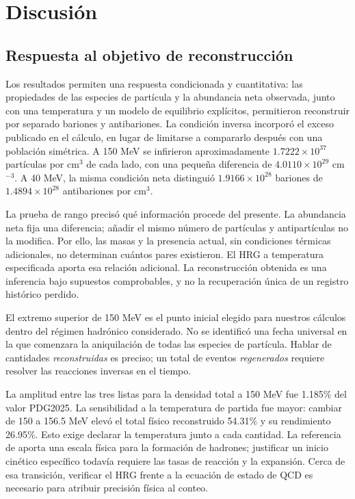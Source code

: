 \section{Discusión}
\subsection{Respuesta al objetivo de reconstrucción}
Los resultados permiten una respuesta condicionada y cuantitativa: las propiedades de las especies de partícula y la abundancia neta observada, junto con una temperatura y un modelo de equilibrio explícitos, permitieron reconstruir por separado bariones y antibariones. La condición inversa incorporó el exceso publicado en el cálculo, en lugar de limitarse a compararlo después con una población simétrica. A 150 MeV se infirieron aproximadamente $1.7222\times10^{37}$ partículas por cm$^3$ de cada lado, con una pequeña diferencia de $4.0110\times10^{29}$ cm$^{-3}$. A 40 MeV, la misma condición neta distinguió $1.9166\times10^{28}$ bariones de $1.4894\times10^{28}$ antibariones por cm$^3$.

La prueba de rango precisó qué información procede del presente. La abundancia neta fija una diferencia; añadir el mismo número de partículas y antipartículas no la modifica. Por ello, las masas y la presencia actual, sin condiciones térmicas adicionales, no determinan cuántos pares existieron. El HRG a temperatura especificada aporta esa relación adicional. La reconstrucción obtenida es una inferencia bajo supuestos comprobables, y no la recuperación única de un registro histórico perdido.

El extremo superior de 150 MeV es el punto inicial elegido para nuestros cálculos dentro del régimen hadrónico considerado. No se identificó una fecha universal en la que comenzara la aniquilación de todas las especies de partícula. Hablar de cantidades \emph{reconstruidas} es preciso; un total de eventos \emph{regenerados} requiere resolver las reacciones inversas en el tiempo.

La amplitud entre las tres listas para la densidad total a 150 MeV fue 1.185\% del valor PDG2025. La sensibilidad a la temperatura de partida fue mayor: cambiar de 150 a 156.5 MeV elevó el total físico reconstruido 54.31\% y su rendimiento 26.95\%. Esto exige declarar la temperatura junto a cada cantidad. La referencia de \citet{Bazavov2019} aporta una escala física para la formación de hadrones; justificar un inicio cinético específico todavía requiere las tasas de reacción y la expansión. Cerca de esa transición, verificar el HRG frente a la ecuación de estado de QCD es necesario para atribuir precisión física al conteo.

